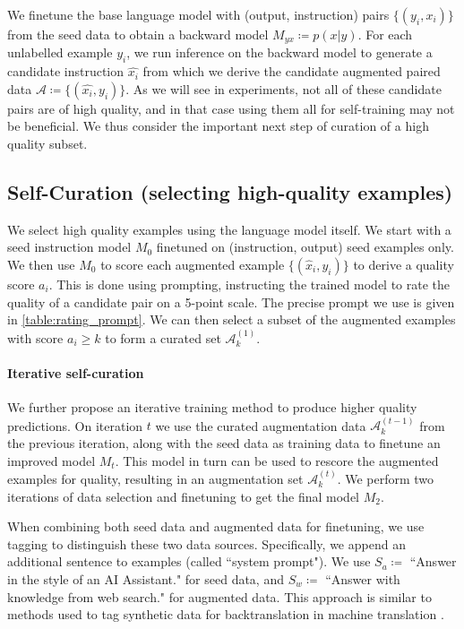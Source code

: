 We finetune the base language model with (output, instruction) pairs $\{(y_{i}, x_{i})\}$ from the seed data to obtain a backward model $M_{yx}\coloneqq p(x|y)$. For each unlabelled example $y_i$, we run inference on the backward model to generate a candidate instruction $\hat{x_{i}}$ from which we  derive the  candidate augmented paired data $\mathcal{A} \coloneqq \{(\hat{x_{i}}, y_{i})\}$.
As we will see in experiments, not all of these candidate pairs are of high quality, and in that case using them all for self-training may not be beneficial. We thus consider the important next step of curation of a high quality subset.

\subsection{Self-Curation (selecting high-quality examples)} 

We select high quality examples using the language model itself. 
We start with a seed instruction model $M_{0}$ finetuned on (instruction, output) seed examples only. We then use $M_{0}$ to score each augmented example $\{(\hat{x}_{i}, y_{i})\}$ to derive a quality score $a_i$.  This is done using prompting, instructing the trained model to rate the quality of a candidate pair on a 5-point scale. The precise prompt we use is given in \autoref{table:rating_prompt}.
We can then select a subset of the augmented examples with score $a_i \ge k$ to form a curated set $\mathcal{A}_k^{(1)}$.

\paragraph{Iterative self-curation} 
We further propose an iterative training method to produce higher quality predictions.
On iteration $t$ we use the curated augmentation data $\mathcal{A}_k^{(t-1)}$ from the previous iteration, along with the seed data as training data to finetune an improved model $M_t$. This model in turn can be used to rescore the augmented examples for quality, resulting in an augmentation set $\mathcal{A}_k^{(t)}$. We perform two iterations of data selection and finetuning to get the final model $M_2$. 

When combining both seed data and augmented data for finetuning, we use tagging to distinguish these two data sources. Specifically, we append an additional sentence to examples (called ``system prompt"). We use $S_a \coloneqq$ ``Answer in the style of an AI Assistant." for seed data, and $S_w \coloneqq$ ``Answer with knowledge from web search." for augmented data. This approach is similar to methods used to tag synthetic data for backtranslation in machine translation \citep{caswell2019tagged}.

